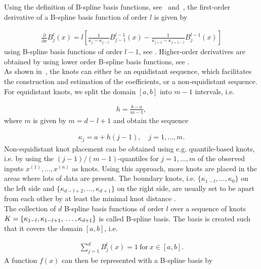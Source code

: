Using the definition of B-spline basis functions, see~ and~, the first-order derivative of a B-spline basis function of order $l$ is given by

\begin{align} \label{eq:Bspline-bf-derivative}
	\frac{\partial}{\partial x} B_j^l(x) = l \left[\frac{1}{\kappa_j - \kappa_{j-l}} B_{j-1}^{l-1}(x) - \frac{1}{\kappa_{j+1} - \kappa_{j+1-l}} B_j^{l-1}(x) \right]
\end{align}
%
using B-spline basis functions of order $l-1$, see \cite{fahrmeir2007regression}. Higher-order derivatives are obtained by using lower order B-spline basis functions, see \cite{deBoor1978practicalGuideToSplines}. \\

As shown in~, the knots can either be an equidistant sequence, which facilitates the construction and estimation of the coefficients, or a non-equidistant sequence. For equidistant knots, we split the domain $[a,b]$ into $m-1$ intervals, i.e.

\begin{align} \label{eq:equidistant-knots-interval}
	h = \frac{b - a} {m - 1},
\end{align}
%
where $m$ is given by $m = d - l + 1$ and obtain the sequence

\begin{align} \label{eq:equidistant-knots-sequence}
	\kappa_j = a + h(j-1), \quad j=1, \dots, m.
\end{align} 
%
Non-equidistant knot placement can be obtained using e.g. quantile-based knots, i.e. by using the $(j-1)/(m-1)$-quantiles for $j=1, \dots, m$ of the observed inputs $x^{(1)}, \dots, x^{(n)}$ as knots. Using this approach, more knots are placed in the areas where lots of data are present. The boundary knots, i.e. $\{\kappa_{1-l}, \dots, \kappa_0\}$ on the left side and $\{\kappa_{d-l+2}, \dots, \kappa_{d+1}\}$ on the right side, are usually set to be apart from each other by at least the minimal knot distance \cite{fahrmeir2007regression}. \\

The collection of $d$ B-spline basis functions of order $l$ over a sequence of knots $K = \{\kappa_{1-l}, \kappa_{1-l+1}, \\ \dots, \kappa_{d+1}\}$ is called B-spline basis. The basis is created such that it covers the domain $[a, b]$, i.e.

\begin{align}
	\sum_{j=1}^d B_j^l(x) = 1 \ \text{for} \ x \in [a,b].
\end{align}
%
A function $f(x)$ can then be represented with a B-spline basis by 

